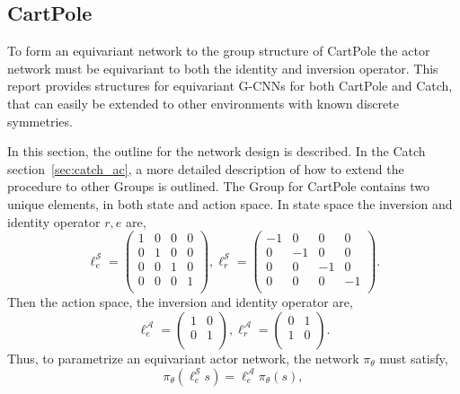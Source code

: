 \subsection{CartPole}

To form an equivariant network to the group structure of CartPole the actor network must be equivariant to both the identity and inversion operator. This report provides structures for equivariant G-CNNs for both CartPole and Catch, that can easily be extended to other environments with known discrete symmetries.


In this section, the outline for the network design is described. In the Catch section~\ref{sec:catch_ac}, a more detailed description of how to extend the procedure to other Groups is outlined.
The Group for CartPole contains two unique elements, in both state and action space. In state space the inversion and identity operator $r, e$ are,
\begin{equation}
	\ell^\mathcal{S}_e =
	\begin{pmatrix}
		1 & 0 & 0 & 0 \\
		0 & 1 & 0 & 0 \\
		0 & 0 & 1 & 0 \\
		0 & 0 & 0 & 1 \\
	\end{pmatrix},
	\ell^\mathcal{S}_r =
	\begin{pmatrix}
		-1 & 0  & 0  & 0  \\
		0  & -1 & 0  & 0  \\
		0  & 0  & -1 & 0  \\
		0  & 0  & 0  & -1 \\
	\end{pmatrix}.
\end{equation}
Then the action space, the inversion and identity operator are,
\begin{equation}
	\ell^\mathcal{A}_e =
	\begin{pmatrix}
		1 & 0 \\
		0 & 1 \\
	\end{pmatrix},
	\ell^\mathcal{A}_r =
	\begin{pmatrix}
		0 & 1 \\
		1 & 0 \\
	\end{pmatrix}.
\end{equation}
Thus, to parametrize an equivariant actor network, the network $\pi_\theta$ must satisfy,
\begin{equation}
	\pi_\theta(\ell^\mathcal{S}_e s) = \ell^\mathcal{A}_e \pi_\theta(s),
\end{equation}
